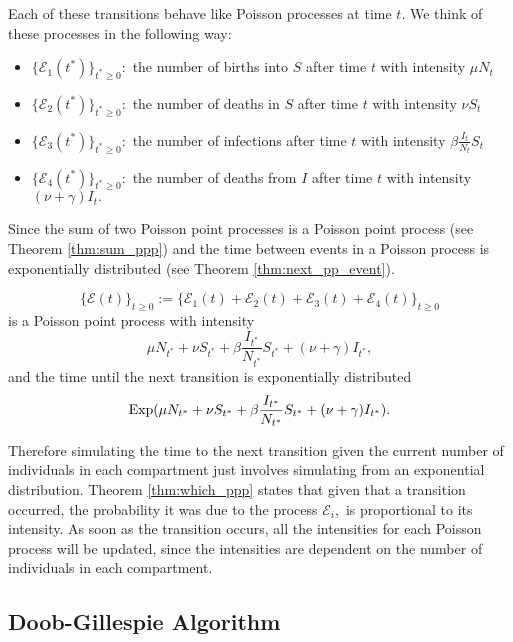Each of these transitions behave like Poisson processes at time $t.$ We think
of these processes in the following way:
\begin{itemize}
    \item $\{\mathcal{E}_1(t^*)\}_{t^*\geq 0}:$
          the number of births into $S$ after time $t$ with intensity
          $\mu N_{t}$
    \item $\{\mathcal{E}_2(t^*)\}_{t^*\geq 0}:$
          the number of deaths in $S$ after time $t$ with intensity
          $\nu S_{t}$
    \item $\{\mathcal{E}_3(t^*)\}_{t^*\geq 0}:$
          the number of infections after time $t$ with intensity
          $\beta \frac{I_{t}}{N_{t}} S_{t}$
    \item $\{\mathcal{E}_4(t^*)\}_{t^*\geq 0}:$
          the number of deaths from $I$ after time $t$ with intensity
          $(\nu + \gamma) I_{t}.$
\end{itemize}

Since the sum of two Poisson point processes is a Poisson point process (see
Theorem \ref{thm:sum_ppp}) and the time between events in a Poisson process
is exponentially distributed (see Theorem \ref{thm:next_pp_event}).

$$
    \{\mathcal{E}(t)\}_{t\geq 0}:=\{\mathcal{E}_1(t) + \mathcal{E}_2(t)
    + \mathcal{E}_3(t) + \mathcal{E}_4(t)\}_{t\geq 0}
$$
is a Poisson point process with intensity
$$\mu N_{t^*} + \nu S_{t^*} + \beta \frac{I_{t^*}}{N_{t^*}} S_{t^*}
    + (\nu + \gamma) I_{t^*},$$
and the time until the next transition is exponentially distributed
$$
    \operatorname{Exp}(\mu N_{t^*} + \nu S_{t^*}
    + \beta \frac{I_{t^*}}{N_{t^*}} S_{t^*} + (\nu + \gamma) I_{t^*}).
$$

Therefore simulating the time to the next transition given
the current number of individuals in each compartment just involves
simulating from an exponential distribution. 
Theorem \ref{thm:which_ppp} states that 
given that a transition occurred, the probability it was due to 
the process
$\mathcal{E}_i,$ is proportional to its intensity. As soon as the transition
occurs, all the intensities for each Poisson process will be updated, since
the intensities are dependent on the number of individuals in each compartment.

\subsection*{Doob-Gillespie Algorithm}

